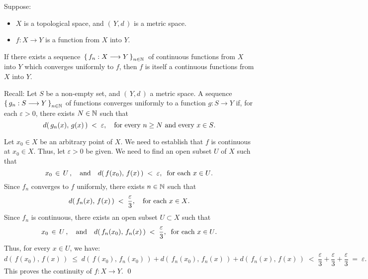 \begin{theorem}
\label{UniformLimitsOfContinuousFunctionsAreContinuous}
\mbox{}\vskip 0.1cm
\noindent
Suppose:
\begin{itemize}
\item	$X$ is a topological space, and $(\,Y,d\,)$ is a metric space.
\item	$f : X \longrightarrow Y$ is a function from $X$ into $Y$.
\end{itemize}
If there exists a sequence \,$\left\{\,f_{n} : X \longrightarrow Y \,\right\}_{n \in \mathbb{N}}$\,
of continuous functions from $X$ into $Y$ which converges uniformly to $f$,
then $f$ is itself a continuous functions from $X$ into $Y$.
\end{theorem}

\begin{remark}
\mbox{}\vskip 0.1cm
\noindent
Recall: Let $S$ be a non-empty set, and $\left(\,Y,d\,\right)$ a metric space. 
A sequence $\left\{\, g_{n} : S \longrightarrow Y \,\right\}_{n\in\mathbb{N}}$ of functions
converges uniformly to a function $g : S \longrightarrow Y$
if, for each $\varepsilon > 0$, there exists $N \in \mathbb{N}$ such that
\begin{equation*}
d\!\left(\,g_{n}(x),\,g(x)\,\right) \; < \; \varepsilon,
\quad\textnormal{for every $n \geq N$ and every $x \in S$}.
\end{equation*}
\end{remark}

\proof
Let $x_{0} \in X$ be an arbitrary point of $X$.
We need to establish that $f$ is continuous at $x_{0} \in X$.
Thus, let $\varepsilon > 0$ be given.
We need to find an open subset $U$ of $X$ such that
\begin{equation*}
x_{0}\,\in\,U\,,
\quad\textnormal{and}\quad
d\!\left(\,f(x_{0}),\,f(x)\,\right) \; < \; \varepsilon,
\;\;
\textnormal{for each $x \in U$}.
\end{equation*}
Since $f_{n}$ converges to $f$ uniformly, there exists $n \in \mathbb{N}$ such that
\begin{equation*}
d\!\left(\,f_{n}(x),\,f(x)\,\right) \; < \; \dfrac{\varepsilon}{3},
\quad\textnormal{for each $x \in X$}.
\end{equation*}
Since $f_{n}$ is continuous, there exists an open subset $U \subset X$ such that
\begin{equation*}
x_{0}\,\in\,U\,,
\quad\textnormal{and}\quad
d\!\left(\,f_{n}(x_{0}),\,f_{n}(x)\,\right) \; < \; \dfrac{\varepsilon}{3},
\;\;
\textnormal{for each $x \in U$}.
\end{equation*}
Thus, for every $x \in U$, we have:
\begin{equation*}
d\!\left(\,f(x_{0}),\,f(x)\,\right)
\;\leq\; d\!\left(\,f(x_{0}),\,f_{n}(x_{0})\,\right) + d\!\left(\,f_{n}(x_{0}),\,f_{n}(x)\,\right) + d\!\left(\,f_{n}(x),\,f(x)\,\right)
\; < \; \dfrac{\varepsilon}{3} + \dfrac{\varepsilon}{3} + \dfrac{\varepsilon}{3}
\; = \; \varepsilon.
\end{equation*}
This proves the continuity of $f : X \longrightarrow Y$.
\qed

